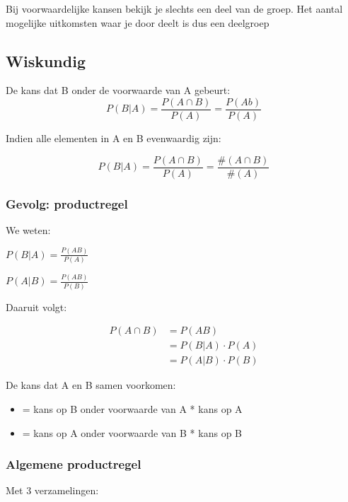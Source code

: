 \documentclass{article}
\begin{document}
Bij voorwaardelijke kansen bekijk je slechts een deel van de groep.
Het aantal mogelijke uitkomsten waar je door deelt is dus een deelgroep

\subsection{Wiskundig}

De kans dat B onder de voorwaarde van A gebeurt:
\begin{equation}
    P(B | A) = \frac{P(A \cap B)}{P(A)} = \frac{P(Ab)}{P(A)}
\end{equation}

Indien alle elementen in A en B evenwaardig zijn:

\begin{equation}
    P(B | A) = \frac{P(A \cap B)}{P(A)} = \frac{\#(A \cap B)}{\#(A)}
\end{equation}

\subsubsection{Gevolg: productregel}

We weten:

$P(B|A) = \frac{P(AB)}{P(A)}$

$P(A|B) = \frac{P(AB)}{P(B)}$

Daaruit volgt:

\begin{equation}
    \begin{aligned}
        P(A \cap B) &= P(AB)\\
        &= P (B|A) \cdot P(A)\\
        &= P (A|B) \cdot P(B)
    \end{aligned}
\end{equation}

De kans dat A en B samen voorkomen:

\begin{itemize}
    \item = kans op B onder voorwaarde van A * kans op A
    \item = kans op A onder voorwaarde van B * kans op B
\end{itemize}

\subsubsection{Algemene productregel}

Met 3 verzamelingen:
\end{document}
